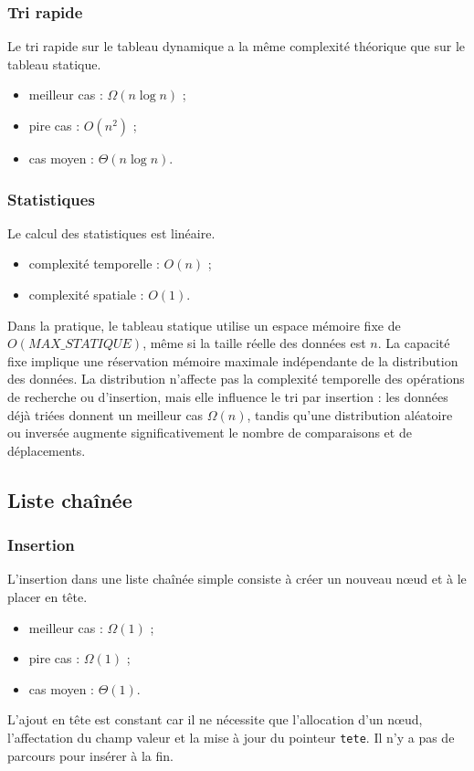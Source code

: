 \documentclass[12pt,a4paper]{article}
\begin{document}
\subsubsection{Tri rapide}
Le tri rapide sur le tableau dynamique a la même complexité théorique que sur le tableau statique.
\begin{itemize}
  \item meilleur cas : $\Omega(n\log n)$ ;
  \item pire cas : $O(n^2)$ ;
  \item cas moyen : $\Theta(n\log n)$.
\end{itemize}

\subsubsection{Statistiques}
Le calcul des statistiques est linéaire.
\begin{itemize}
  \item complexité temporelle : $O(n)$ ;
  \item complexité spatiale : $O(1)$.
\end{itemize}
Dans la pratique, le tableau statique utilise un espace mémoire fixe de $O(MAX\_STATIQUE)$, même si la taille réelle des données est $n$. La capacité fixe implique une réservation mémoire maximale indépendante de la distribution des données. La distribution n’affecte pas la complexité temporelle des opérations de recherche ou d’insertion, mais elle influence le tri par insertion : les données déjà triées donnent un meilleur cas $\Omega(n)$, tandis qu’une distribution aléatoire ou inversée augmente significativement le nombre de comparaisons et de déplacements.
\subsection{Liste chaînée}

\subsubsection{Insertion}
L’insertion dans une liste chaînée simple consiste à créer un nouveau nœud et à le placer en tête.
\begin{itemize}
  \item meilleur cas : $\Omega(1)$ ;
  \item pire cas : $\Omega(1)$ ;
  \item cas moyen : $\Theta(1)$.
\end{itemize}
L’ajout en tête est constant car il ne nécessite que l’allocation d’un nœud, l’affectation du champ valeur et la mise à jour du pointeur \texttt{tete}. Il n’y a pas de parcours pour insérer à la fin.
\end{document}

